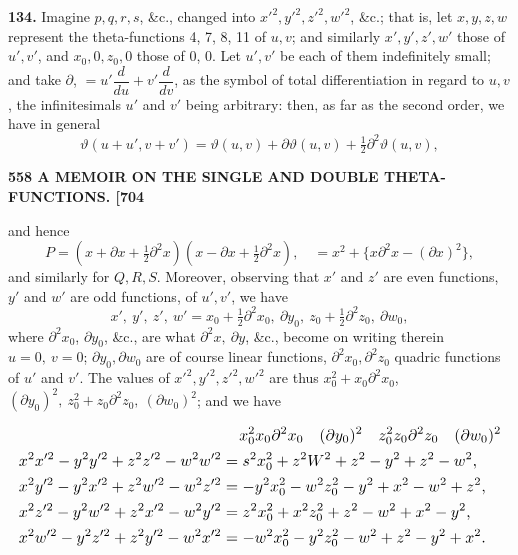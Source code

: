 \documentclass[11pt]{article}
\begin{document}
\medskip
\textbf{134.} Imagine $p, q, r, s$, \&c., changed into $x'^2, y'^2, z'^2, w'^2$, \&c.; that is, let $x, y, z, w$ represent the theta-functions 4, 7, 8, 11 of $u, v$; and similarly $x', y', z', w'$ those of $u', v'$, and $x_0, 0, z_0, 0$ those of 0, 0. Let $u', v'$ be each of them indefinitely small; and take $\partial$, $= u'\dfrac{d}{du} + v'\dfrac{d}{dv}$, as the symbol of total differentiation in regard to $u, v$, the infinitesimals $u'$ and $v'$ being arbitrary: then, as far as the second order, we have in general
\[
\vartheta(u + u', v + v') = \vartheta(u, v) + \partial\vartheta(u, v) + \tfrac{1}{2}\partial^2\vartheta(u, v),
\]

\newpage
\noindent\textbf{558 \hfill A MEMOIR ON THE SINGLE AND DOUBLE THETA-FUNCTIONS. \hfill [704}

\medskip
and hence
\[
P = (x + \partial x + \tfrac{1}{2}\partial^2 x)(x - \partial x + \tfrac{1}{2}\partial^2 x),\quad = x^2 + \{x\partial^2 x - (\partial x)^2\},
\]
and similarly for $Q, R, S$. Moreover, observing that $x'$ and $z'$ are even functions, $y'$ and $w'$ are odd functions, of $u', v'$, we have
\[
x',\ y',\ z',\ w' = x_0 + \tfrac{1}{2}\partial^2 x_0,\ \partial y_0,\ z_0 + \tfrac{1}{2}\partial^2 z_0,\ \partial w_0,
\]
where $\partial^2 x_0$, $\partial y_0$, \&c., are what $\partial^2 x,\ \partial y$, \&c., become on writing therein $u = 0,\ v = 0$; $\partial y_0, \partial w_0$ are of course linear functions, $\partial^2 x_0, \partial^2 z_0$ quadric functions of $u'$ and $v'$. The values of $x'^2, y'^2, z'^2, w'^2$ are thus $x_0^2 + x_0\partial^2 x_0$, $(\partial y_0)^2,\ z_0^2 + z_0\partial^2 z_0,\ (\partial w_0)^2$; and we have

{\footnotesize
\[
\resizebox{\textwidth}{!}{$\displaystyle
\begin{aligned}
& \qquad\qquad\qquad\qquad\qquad\qquad\qquad x_0^2 x_0\partial^2 x_0\quad (\partial y_0)^2\quad z_0^2 z_0\partial^2 z_0\quad (\partial w_0)^2\\
& x^2 x'^2 - y^2 y'^2 + z^2 z'^2 - w^2 w'^2 = s^2 x_0^2 + z^2 W^2 + z^2 - y^2 + z^2 - w^2,\\
& x^2 y'^2 - y^2 x'^2 + z^2 w'^2 - w^2 z'^2 = -y^2 x_0^2 - w^2 z_0^2 - y^2 + x^2 - w^2 + z^2,\\
& x^2 z'^2 - y^2 w'^2 + z^2 x'^2 - w^2 y'^2 = z^2 x_0^2 + x^2 z_0^2 + z^2 - w^2 + x^2 - y^2,\\
& x^2 w'^2 - y^2 z'^2 + z^2 y'^2 - w^2 x'^2 = -w^2 x_0^2 - y^2 z_0^2 - w^2 + z^2 - y^2 + x^2.\\
\end{aligned}
$}
\]
}
\end{document}
